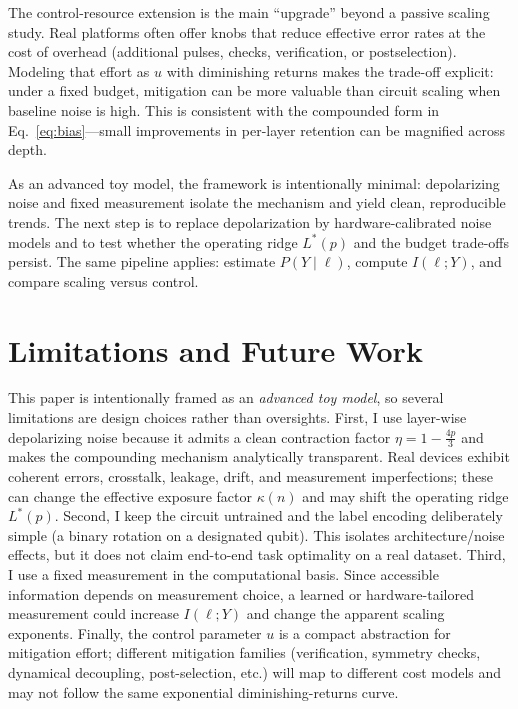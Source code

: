 \documentclass[journal]{IEEEtran}
\newcommand{\MI}{I(\ell;Y)}
\begin{document}
The control-resource extension is the main ``upgrade'' beyond a passive scaling study. Real platforms often offer knobs that reduce effective error rates at the cost of overhead (additional pulses, checks, verification, or postselection). Modeling that effort as $u$ with diminishing returns makes the trade-off explicit: under a fixed budget, mitigation can be more valuable than circuit scaling when baseline noise is high. This is consistent with the compounded form in Eq.~\eqref{eq:bias}---small improvements in per-layer retention can be magnified across depth.

As an advanced toy model, the framework is intentionally minimal: depolarizing noise and fixed measurement isolate the mechanism and yield clean, reproducible trends. The next step is to replace depolarization by hardware-calibrated noise models and to test whether the operating ridge $L^{\ast}(p)$ and the budget trade-offs persist. The same pipeline applies: estimate $P(Y\mid \ell)$, compute $\MI$, and compare scaling versus control.

\section{Limitations and Future Work}
This paper is intentionally framed as an \emph{advanced toy model}, so several limitations are design choices rather than oversights. First, I use layer-wise depolarizing noise because it admits a clean contraction factor $\eta=1-\tfrac{4p}{3}$ and makes the compounding mechanism analytically transparent. Real devices exhibit coherent errors, crosstalk, leakage, drift, and measurement imperfections; these can change the effective exposure factor $\kappa(n)$ and may shift the operating ridge $L^{\ast}(p)$. Second, I keep the circuit untrained and the label encoding deliberately simple (a binary rotation on a designated qubit). This isolates architecture/noise effects, but it does not claim end-to-end task optimality on a real dataset. Third, I use a fixed measurement in the computational basis. Since accessible information depends on measurement choice, a learned or hardware-tailored measurement could increase $\MI$ and change the apparent scaling exponents. Finally, the control parameter $u$ is a compact abstraction for mitigation effort; different mitigation families (verification, symmetry checks, dynamical decoupling, post-selection, etc.) will map to different cost models and may not follow the same exponential diminishing-returns curve.
\end{document}

